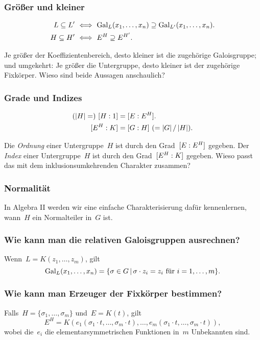 \documentclass{../../algblatt}
\begin{document}
\subsubsection*{Größer und kleiner}
\vspace{-1.5em}
\begin{align*}
  L \subseteq L' &\ \Longleftrightarrow\ 
    \mathrm{Gal}_L(x_1,\ldots,x_n) \supseteq \Gal_{L'}(x_1,\ldots,x_n). \\
  H \subseteq H' &\ \Longleftrightarrow\ 
    E^H \supseteq E^{H'}.
\end{align*}

Je größer der Koeffizientenbereich, desto kleiner ist die zugehörige
Galoisgruppe; und umgekehrt: Je größer die Untergruppe, desto kleiner ist der
zugehörige Fixkörper. Wieso sind beide Aussagen anschaulich?


\subsubsection*{Grade und Indizes}
\vspace{-1.5em}
\begin{align*}
  (|H| =)\ \gra{H}{1} &= \gra{E}{E^H}. \\
  \gra{E^H}{K} &= \gra{G}{H}\ (= |G| \mathop{/} |H|).
\end{align*}

Die \emph{Ordnung} einer Untergruppe~$H$ ist durch den
Grad~$[E:E^H]$ gegeben. Der \emph{Index} einer Untergruppe~$H$ ist durch
den Grad~$[E^H:K]$ gegeben. Wieso passt das mit dem inklusionsumkehrenden
Charakter zusammen?


\subsubsection*{Normalität}

In Algebra II werden wir eine einfache Charakterisierung dafür
kennenlernen, wann~$H$ ein Normalteiler in~$G$ ist.


\newpage
\subsubsection*{Wie kann man die relativen Galoisgruppen ausrechnen?}

Wenn~$L = K(z_1,\ldots,z_m)$, gilt
\[ \mathrm{Gal}_L(x_1,\ldots,x_n) = \{ \sigma \in G \,|\,
  \text{$\sigma \cdot z_i = z_i$ für~$i = 1,\ldots,m$} \}. \]


\subsubsection*{Wie kann man Erzeuger der Fixkörper bestimmen?}
Falls~$H = \{ \sigma_1,\ldots,\sigma_m \}$ und~$E = K(t)$, gilt
\[ E^H = K(
  e_1(\sigma_1 \cdot t, \ldots, \sigma_m \cdot t),
  \ldots,
  e_m(\sigma_1 \cdot t, \ldots, \sigma_m \cdot t)), \]
wobei die~$e_i$ die elementarsymmetrischen Funktionen in~$m$ Unbekannten sind.
\end{document}
